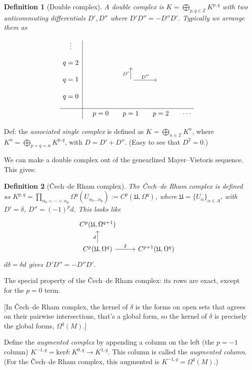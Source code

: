 \documentclass{article}
\theoremstyle{mystyle}
\newtheorem*{definition}{Definition}%
\theoremstyle{remark}
\numberwithin{equation}{section}
\begin{document}
\begin{definition}[Double complex] A \emph{double complex} is $K = \bigoplus_{p,q\in \mathbb{Z}} K^{p,q}$ with two anticommuting differentials $D',D''$ where $D'D''=-D''D'$. Typically we arrange them as
$$
\begin{tikzcd}[column sep = small, row sep = small]
\arrow[dd,dash,
    start anchor={[xshift=4ex, yshift=4ex]},
    end anchor={[xshift=4ex,yshift = -15ex]}
    ]
\vdots &&&&\\
q=2&~&~&&\\q=1&&\ar[u,"D'"] \ar[r,"D''"] &~&\\ q=0&~&~&\\
\hline
&p=0&p=1&p=2&\cdots
\end{tikzcd}
$$
\end{definition}

Def: the \emph{associated single complex} is defined as $K = \bigoplus_{n\in \mathbb{Z}} K^n$, where $K^n = \bigoplus_{p+q=n}K^{p,q}$, with $D = D'+D''$. (Easy to see that $D^2 = 0$.)

We can make a double complex out of the genearlized Mayer--Vietoris sequence. This gives:


\begin{definition}[Čech--de Rham complex] The \emph{Čech--de Rham complex} is defined as $K^{p,q}=\prod_{\alpha_0<\cdots <\alpha_p}
\Omega^q(U_{\alpha_0...\alpha_p}):=
C^p(\mathfrak{U},\Omega^q)$, where $\mathfrak{U} = \{U_\alpha\}_{\alpha \in A}$, with $D'=\delta$, $D'' = (-1)^pd$. This looks like
$$
\begin{tikzcd}
C^p(\mathfrak{U},\Omega^{q+1}) &\\
C^p(\mathfrak{U},\Omega^q)\ar[u,"d"] \ar[r,"\delta"] &
C^{p+1}(\mathfrak{U},\Omega^q)
\end{tikzcd}
$$
$d\delta=\delta d$ gives $D'D''=-D''D'$. 
\end{definition}


The special property of the Čech--de Rham complex: its rows are exact, except for the $p=0$ term.


[In Čech--de Rham complex, the kernel of $\delta$ is the forms on open sets that agrees on their pairwise intersections, that's a global form, so the kernel of $\delta$ is precisely the global forms, $\Omega^q(M)$.]

Define the \emph{augmented complex} by appending a column on the left (the $p=-1$ column) $K^{-1,q} = \mathrm{ker}\delta \colon K^{0,q}\rightarrow K^{1,q}$. This column is called the \emph{augmented column}. (For the Čech--de Rham complex, this augmented is $K^{-1,q} = \Omega^q(M)$.)
\end{document}
